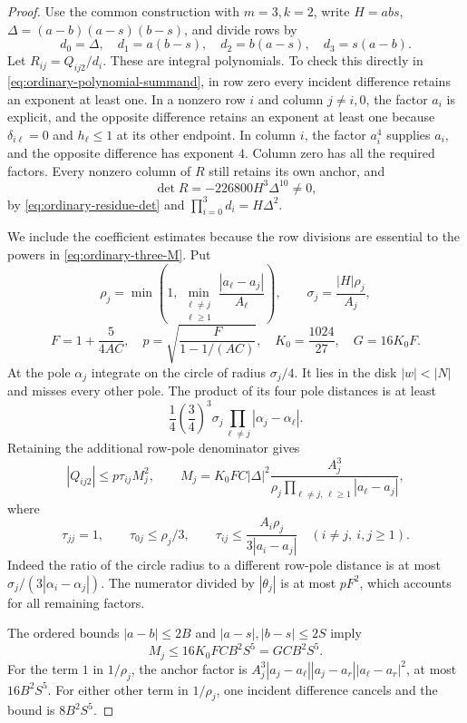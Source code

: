 \documentclass[12pt]{article}
\numberwithin{equation}{section}
\begin{document}
\begin{proof}
Use the common construction with $m=3,k=2$, write
$H=abs$, $\Delta=(a-b)(a-s)(b-s)$, and divide rows by
\[
 d_0=\Delta,\quad d_1=a(b-s),\quad
 d_2=b(a-s),\quad d_3=s(a-b).
\]
Let $R_{ij}=Q_{ij2}/d_i$.  These are integral polynomials.
To check this directly in \eqref{eq:ordinary-polynomial-summand},
in row zero every incident difference retains an exponent at least one.
In a nonzero row $i$ and column $j\ne i,0$, the factor $a_i$ is
explicit, and the opposite difference retains an exponent at least
one because $\delta_{i\ell}=0$ and $h_\ell\le1$ at its other
endpoint.  In column $i$, the factor $a_i^4$ supplies $a_i$, and
the opposite difference has exponent $4$.  Column zero has all the
required factors.  Every nonzero column of $R$ still retains its own
anchor, and
\[
 \det R=-226800H^3\Delta^{10}\ne0,
\]
by \eqref{eq:ordinary-residue-det} and
$\prod_{i=0}^3d_i=H\Delta^2$.

We include the coefficient estimates because the row divisions are
essential to the powers in \eqref{eq:ordinary-three-M}.  Put
\[
 \rho_j=\min\left(1,\min_{\substack{\ell\ne j\\\ell\ge1}}
               \frac{|a_\ell-a_j|}{A_\ell}\right),\qquad
 \sigma_j=\frac{|H|\rho_j}{A_j},
\]
\[
 F=1+\frac5{4AC},\quad
 p=\sqrt{\frac{F}{1-1/(AC)}},\quad
 K_0=\frac{1024}{27},\quad G=16K_0F.
\]
At the pole $\alpha_j$ integrate on the circle of radius
$\sigma_j/4$.  It lies in the disk $|w|<|N|$ and misses every other
pole.  The product of its four pole distances is at least
\[
 \frac14\left(\frac34\right)^3
 \sigma_j\prod_{\ell\ne j}|\alpha_j-\alpha_\ell|.
\]
Retaining the additional row-pole denominator gives
\[
 |Q_{ij2}|\le p\tau_{ij}M_j^2,\qquad
 M_j=K_0FC|\Delta|^2
       \frac{A_j^3}{\rho_j\prod_{\ell\ne j,\,\ell\ge1}|a_\ell-a_j|},
\]
where
\[
 \tau_{jj}=1,\qquad \tau_{0j}\le\rho_j/3,
 \qquad \tau_{ij}\le
       \frac{A_i\rho_j}{3|a_i-a_j|}\quad(i\ne j,\ i,j\ge1).
\]
Indeed the ratio of the circle radius to a different row-pole distance
is at most $\sigma_j/(3|\alpha_i-\alpha_j|)$.  The numerator
divided by $|\theta_j|$ is at most $pF^2$, which accounts for all
remaining factors.

The ordered bounds $|a-b|\le2B$ and
$|a-s|,|b-s|\le2S$ imply
\begin{equation}\label{eq:ordinary-three-base-bound}
 M_j\le16K_0FCB^2S^5=GCB^2S^5.
\end{equation}
For the term $1$ in $1/\rho_j$, the anchor factor is
$A_j^3|a_j-a_\ell||a_j-a_r||a_\ell-a_r|^2$, at most
$16B^2S^5$.  For either other term in $1/\rho_j$, one incident
difference cancels and the bound is $8B^2S^5$.


\end{proof}
\end{document}
